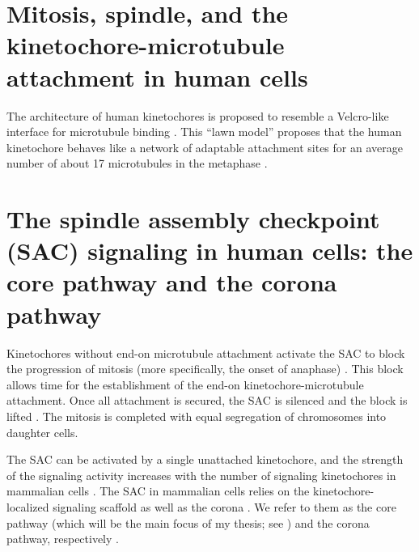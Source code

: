\section{Mitosis, spindle, and the kinetochore-microtubule attachment in human cells}


The architecture of human kinetochores is proposed to resemble a Velcro-like interface for microtubule binding \cite{Velcro}. This ``lawn model'' proposes that the human kinetochore behaves like a network of adaptable attachment sites for an average number of about 17 microtubules in the metaphase \cite{Wendell1993, Zaytsev2014, Zaytsev2015, Kukreja2020}.




\section{The spindle assembly checkpoint (SAC) signaling in human cells: the core pathway and the corona pathway}

Kinetochores without end-on microtubule attachment activate the SAC to block the progression of mitosis (more specifically, the onset of anaphase) \cite{GSK923295MonastrolCotreatment, GSK923295LateralAttachmentEM, LateralAttachmentSAC}. This block allows time for the establishment of the end-on kinetochore-microtubule attachment. Once all attachment is secured, the SAC is silenced and the block is lifted \cite{SACActivationAndSilencing}. The mitosis is completed with equal segregation of chromosomes into daughter cells.

The SAC can be activated by a single unattached kinetochore, and the strength of the signaling activity increases with the number of signaling kinetochores in mammalian cells \cite{RiederNormalProgression, Rheostat, Ablation}. The SAC in mammalian cells relies on the kinetochore-localized signaling scaffold  as well as the corona \cite{GSK923295LateralAttachmentEM, LateralAttachmentSAC, CoronaActivatesSAC}. We refer to them as the core pathway (which will be the main focus of my thesis; see ) and the corona pathway, respectively \cite{100nMNoc, eSAC}.

